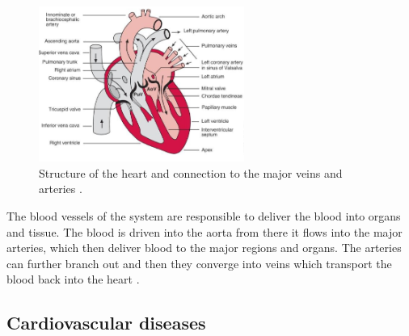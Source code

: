 \begin{figure}[ht!]
  \centering
  \includegraphics[width=0.6\textwidth]{Figures/heart}
  \caption{Structure of the heart and connection to the major veins and arteries \cite{Levick2010Introduction5ed}.}
  \label{fig:heart}
\end{figure}


The blood vessels of the system are responsible to deliver the blood into organs and tissue. The blood is driven into the aorta from there it flows into the major arteries, which then deliver blood to the major regions and organs. The arteries can further branch out and then they converge into veins which transport the blood back into the heart \cite{Levick2010Introduction5ed}.\par

\subsection{Cardiovascular diseases}



